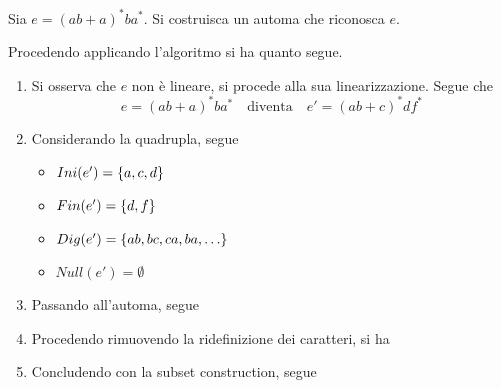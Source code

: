 \documentclass{subfiles}
\begin{document}
\begin{Example*}
    Sia \(e = (ab + a)^{*} ba^{*}\). Si costruisca un automa che riconosca \(e\).
    \begin{Solution*}
        Procedendo applicando l'algoritmo si ha quanto segue.
        \begin{enumerate}
            \item Si osserva che \(e\) non è lineare, si procede alla sua linearizzazione. Segue che
                  \[
                      e = (ab + a)^{*}ba^{*}  \quad \text{diventa} \quad e' = (ab + c)^{*}df^{*}
                  \]
                  \vspace{-12.5pt}
            \item Considerando la quadrupla, segue
                  \begin{multicols}{2}
                      \begin{itemize}
                          \item \(Ini(e') = \left\{a, c, d\right\}\)
                          \item \(Fin(e') = \left\{d, f\right\}\)
                          \item \(Dig(e') = \left\{ab, bc, ca, ba, \ldots\right\}\)
                          \item \(Null(e') = \emptyset\)
                      \end{itemize}
                  \end{multicols}

            \item Passando all'automa, segue
                  

            \item Procedendo rimuovendo la ridefinizione dei caratteri, si ha
                  

            \item Concludendo con la subset construction, segue
                  

        \end{enumerate}
    \end{Solution*}
\end{Example*}
\end{document}
